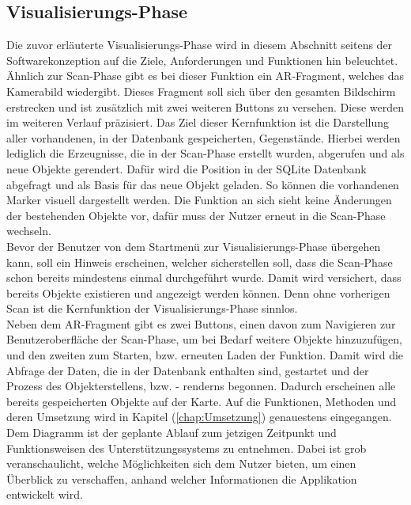 \subsection*{Visualisierungs-Phase}
Die zuvor erläuterte Visualisierungs-Phase wird in diesem Abschnitt seitens der Softwarekonzeption auf die Ziele, Anforderungen und 
Funktionen hin beleuchtet.
\\ 
Ähnlich zur Scan-Phase gibt es bei dieser Funktion ein \acs{AR}-Fragment, welches das Kamerabild wiedergibt. Dieses Fragment soll sich 
über den gesamten Bildschirm erstrecken und ist zusätzlich mit zwei weiteren Buttons zu versehen. Diese werden im weiteren Verlauf 
präzisiert. Das Ziel dieser Kernfunktion ist die Darstellung aller vorhandenen, in der Datenbank gespeicherten, Gegenstände. Hierbei werden 
lediglich die Erzeugnisse, die in der Scan-Phase erstellt wurden, abgerufen und als neue Objekte gerendert. Dafür wird die Position in der 
SQLite Datenbank abgefragt und als Basis für das neue Objekt geladen. So können die vorhandenen Marker visuell dargestellt werden. Die 
Funktion an sich sieht keine Änderungen der bestehenden Objekte vor, dafür muss der Nutzer erneut in die Scan-Phase wechseln.
\\ 
Bevor der Benutzer von dem Startmenü zur Visualisierungs-Phase übergehen kann, soll ein Hinweis erscheinen, welcher sicherstellen soll, dass 
die Scan-Phase schon bereits mindestens einmal durchgeführt wurde. Damit wird versichert, dass bereits Objekte existieren und angezeigt 
werden können. Denn ohne vorherigen Scan ist die Kernfunktion der Visualisierungs-Phase sinnlos.
\\
Neben dem \acs{AR}-Fragment gibt es zwei Buttons, einen davon zum Navigieren zur Benutzeroberfläche der Scan-Phase, um bei Bedarf weitere Objekte 
hinzuzufügen, und den zweiten zum Starten, bzw. erneuten Laden der Funktion. Damit wird die Abfrage der Daten, die in der Datenbank 
enthalten sind, gestartet und der Prozess des Objekterstellens, bzw. - renderns begonnen. Dadurch erscheinen alle bereits gespeicherten 
Objekte auf der Karte. Auf die Funktionen, Methoden und deren Umsetzung wird in Kapitel (\ref{chap:Umsetzung}) genauestens eingegangen.
\\ 
\linebreak
Dem Diagramm ist der geplante Ablauf zum jetzigen Zeitpunkt und Funktionsweisen des Unterstützungssystems zu entnehmen. Dabei ist grob 
veranschaulicht, welche Möglichkeiten sich dem Nutzer bieten, um einen Überblick zu verschaffen, anhand welcher Informationen die 
Applikation entwickelt wird. 
